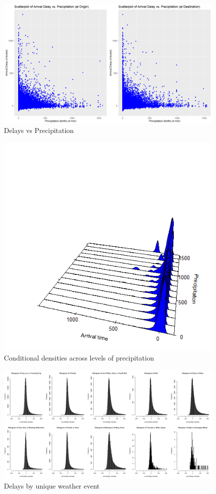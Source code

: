 \documentclass[12pt, a4paper, openany]{book}
\begin{document}
			\begin{figure}[h]
			\centering
	 		\includegraphics[width = 1 \textwidth]{../figures/PLOTS FOR REPORT/Chapter 4/Figure 4.42}
	 		\caption{Delays vs Precipitation}
	 		\end{figure}

			\begin{figure}[h]
			\centering
	 		\includegraphics[width = .8 \textwidth]{../figures/CDE_prcp}
	 		\caption{Conditional densities across levels of precipitation}
	 		\end{figure}

			\begin{figure}[h]
			\centering
	 		\includegraphics[width = 1 \textwidth]{../figures/PLOTS FOR REPORT/Chapter 4/Figure 4.43}
	 		\caption{Delays by unique weather event}
	 		\end{figure}
\end{document}
